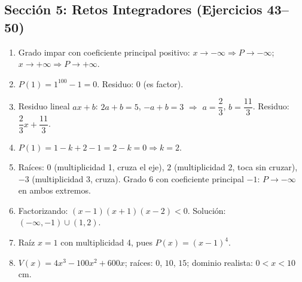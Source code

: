 \documentclass[12pt, letterpaper]{article}
\begin{document}
\subsection*{Sección 5: Retos Integradores (Ejercicios 43--50)}
\begin{enumerate}[resume=respuestas, leftmargin=*, label=\textbf{\arabic*.}]
  \item Grado impar con coeficiente principal positivo: $x \to -\infty \Rightarrow P \to -\infty$; $x \to +\infty \Rightarrow P \to +\infty$.
  \item $P(1) = 1^{100} - 1 = 0$. Residuo: $0$ (es factor).
  \item Residuo lineal $ax + b$: $2a + b = 5$, $-a + b = 3$ $\Rightarrow$ $a = \dfrac{2}{3}$, $b = \dfrac{11}{3}$. Residuo: $\dfrac{2}{3}x + \dfrac{11}{3}$.
  \item $P(1) = 1 - k + 2 - 1 = 2 - k = 0 \Rightarrow k = 2$.
  \item Raíces: $0$ (multiplicidad 1, cruza el eje), $2$ (multiplicidad 2, toca sin cruzar), $-3$ (multiplicidad 3, cruza). Grado 6 con coeficiente principal $-1$: $P \to -\infty$ en ambos extremos.
  \item Factorizando: $(x - 1)(x + 1)(x - 2) < 0$. Solución: $(-\infty, -1) \cup (1, 2)$.
  \item Raíz $x = 1$ con multiplicidad 4, pues $P(x) = (x - 1)^4$.
  \item $V(x) = 4x^3 - 100x^2 + 600x$; raíces: $0$, $10$, $15$; dominio realista: $0 < x < 10$ cm.
\end{enumerate}
\fi
\end{document}
